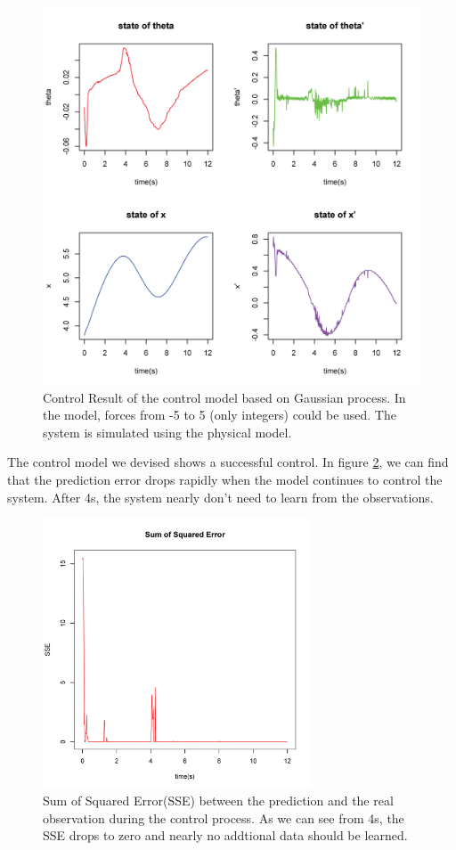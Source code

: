 \documentclass[11pt,twoside,a4paper]{article}
\begin{document}
\begin{figure}[!]
\centering
\includegraphics[width=14cm]{control-result.png}
\caption{Control Result of the control model based on Gaussian
  process. In the model, forces from -5 to 5 (only integers) could be
  used. The system is simulated using the physical model.}
\label{control-result}
\end{figure}

The control model we devised shows a successful control. In figure
\ref{control-error}, we can find that the prediction error drops
rapidly when the model continues to control the system. After 4s, the
system nearly don't need to learn from the observations. 

\begin{figure}[!]
\centering
\includegraphics[width=8cm]{control-error.png}
\caption{Sum of Squared Error(SSE) between the prediction and the real
  observation during the control process. As we can see from 4s, the
  SSE drops to zero and nearly no addtional data should be learned.}
\label{control-error}
\end{figure}
\end{document}

